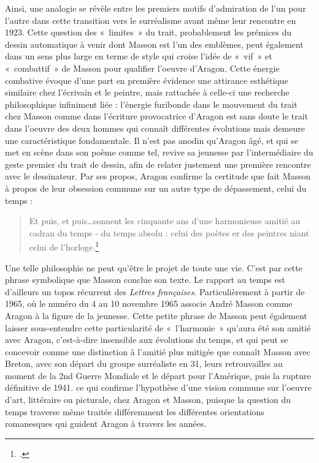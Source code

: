 	Ainsi, une analogie se révèle entre les premiers motifs d’admiration de l’un pour l’autre dans cette transition vers le surréalisme avant même leur rencontre en 1923. Cette question des « limites » du trait, probablement les prémices du dessin automatique à venir dont Masson est l’un des emblèmes, peut également dans un sens plus large en terme de style qui croise l’idée de « vif » et « combattif » de Masson pour qualifier l’oeuvre d’Aragon. Cette énergie combative évoque d’une part en première évidence une attirance esthétique similaire chez l’écrivain et le peintre, mais rattachée à celle-ci une recherche philosophique infiniment liée : l’énergie furibonde dans le mouvement du trait chez Masson comme dans l’écriture provocatrice d’Aragon est sans doute le trait dans l’oeuvre des deux hommes qui connaît différentes évolutions mais demeure une caractéristique fondamentale. Il n’est pas anodin qu’Aragon âgé, et qui se met en scène dans son poème comme tel, revive sa jeunesse par l’intermédiaire du geste premier du trait de dessin, afin de relater justement une première rencontre avec le dessinateur. Par ses propos, Aragon confirme la certitude que fait Masson à propos de leur obsession commune sur un autre type de dépassement, celui du temps : 
\begin{verse}    
Et puis, et puis…sonnent les cinquante ans d’une harmonieuse amitié au cadran du temps - du temps absolu : celui des poètes er des peintres niant celui de l’horloge.\footcite[p84]{rebelle}\end{verse}


	Une telle philosophie ne peut qu’être le projet de toute une vie. C’est par cette phrase symbolique que Masson conclue son texte. Le rapport au temps est d’ailleurs un topos récurrent des \emph{Lettres françaises}. Particulièrement à partir de 1965, où le numéro du 4 au 10 novembre 1965 associe André Masson comme Aragon à la figure de la jeunesse. Cette petite phrase de Masson peut également laisser sous-entendre cette particularité de « l’harmonie » qu’aura été son amitié avec Aragon, c’est-à-dire insensible aux  évolutions du temps, et qui peut se concevoir comme une distinction à l’amitié plus mitigée que connaît Masson avec Breton, avec son départ du groupe surréaliste en 31, leurs retrouvailles au moment de la 2nd Guerre Mondiale et le départ pour l’Amérique, puis la rupture définitive de 1941. ce qui confirme l’hypothèse d’une vision commune sur l’oeuvre d’art, littéraire ou picturale, chez Aragon et Masson, puisque la question du temps traverse même traitée différemment les différentes orientations romanesques qui guident Aragon à travers les années.

